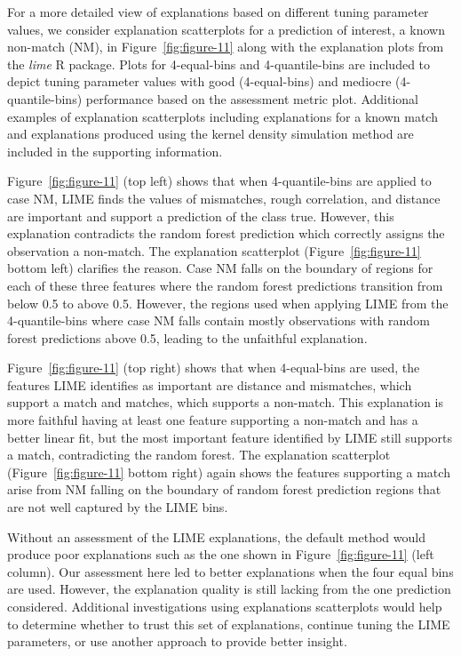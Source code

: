 \documentclass[AMS,STIX2COL]{WileyNJD-v2}\usepackage[]{graphicx}\usepackage[]{color}
\begin{document}
For a more detailed view of explanations based on different tuning parameter values, we consider explanation scatterplots for a prediction of interest, a known non-match (NM), in Figure~\ref{fig:figure-11} along with the explanation plots from the \emph{lime} R package. Plots for 4-equal-bins and 4-quantile-bins are included to depict tuning parameter values with good (4-equal-bins) and mediocre (4-quantile-bins) performance based on the assessment metric plot. Additional examples of explanation scatterplots including explanations for a known match and explanations produced using the kernel density simulation method are included in the supporting information.

Figure~\ref{fig:figure-11} (top left) shows that when 4-quantile-bins are applied to case NM, LIME finds the values of mismatches, rough correlation, and distance are important and support a prediction of the class true. However, this explanation contradicts the random forest prediction which correctly assigns the observation a non-match. The explanation scatterplot (Figure~\ref{fig:figure-11} bottom left) clarifies the reason. Case NM falls on the boundary of regions for each of these three features where the random forest predictions transition from below 0.5 to above 0.5. However, the regions used when applying LIME from the 4-quantile-bins where case NM falls contain mostly observations with random forest predictions above 0.5, leading to the unfaithful explanation.

Figure~\ref{fig:figure-11} (top right) shows that when 4-equal-bins are used, the features LIME identifies as important are distance and mismatches, which support a match and matches, which supports a non-match. This explanation is more faithful having at least one feature supporting a non-match and has a better linear fit, but the most important feature identified by LIME still supports a match, contradicting the random forest. The explanation scatterplot (Figure~\ref{fig:figure-11} bottom right) again shows the features supporting a match arise from NM falling on the boundary of random forest prediction regions that are not well captured by the LIME bins.

Without an assessment of the LIME explanations, the default method would produce poor explanations such as the one shown in Figure~\ref{fig:figure-11} (left column). Our assessment here led to better explanations when the four equal bins are used. However, the explanation quality is still lacking from the one prediction considered. Additional investigations using explanations scatterplots would help to determine whether to trust this set of explanations, continue tuning the LIME parameters, or use another approach to provide better insight.
\end{document}
